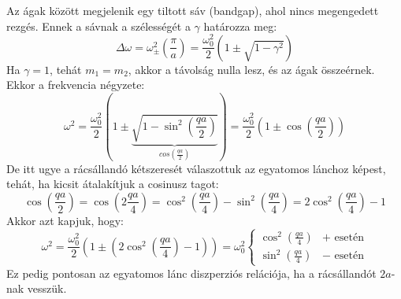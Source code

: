\documentclass[../main.tex]{subfiles}
\begin{document}
Az ágak között megjelenik egy tiltott sáv (bandgap), ahol nincs megengedett rezgés. Ennek a sávnak a szélességét a $\gamma$ határozza meg:
\begin{equation}
    \Delta \omega = \omega^2_\pm (\frac{\pi}{a}) = \frac{\omega_0^2}{2} \left( 1 \pm \sqrt{1 - \gamma^2} \right)
\end{equation}
Ha $\gamma = 1$, tehát $m_1 = m_2$, akkor a távolság nulla lesz, és az ágak összeérnek. Ekkor a frekvencia négyzete:
\begin{equation}
    \omega^2 = \frac{\omega_0^2}{2} \left( 1 \pm \underbrace{\sqrt{1 - \sin^2 \left(\frac{q a}{2}\right)}}_{cos\left(\frac{qa}{2}\right)} \right) = \frac{\omega_0^2}{2} \left( 1 \pm \cos\left(\frac{q a}{2}\right) \right)
\end{equation}
De itt ugye a rácsállandó kétszeresét válaszottuk az egyatomos lánchoz képest, tehát, ha kicsit átalakítjuk a cosinusz tagot:
\begin{equation}
    \cos \left(\frac{q a}{2}\right) = \cos(2 \frac{q a}{4}) = \cos^2 \left(\frac{q a}{4}\right) - \sin^2 \left(\frac{q a}{4}\right) = 2 \cos^2 \left(\frac{q a}{4}\right) - 1
\end{equation}
Akkor azt kapjuk, hogy:
\begin{equation}
    \omega^2 = \frac{\omega_0^2}{2} \left( 1 \pm (2 \cos^2 \left(\frac{q a}{4}\right) - 1) \right) = \omega_0^2
    \begin{cases}
        \cos^2 \left(\frac{q a}{4}\right) & + \text{ esetén} \\
        \sin^2 \left(\frac{q a}{4}\right) & - \text{ esetén}
    \end{cases}
\end{equation}
Ez pedig pontosan az egyatomos lánc diszperziós relációja, ha a rácsállandót $2a$-nak vesszük.
\end{document}

